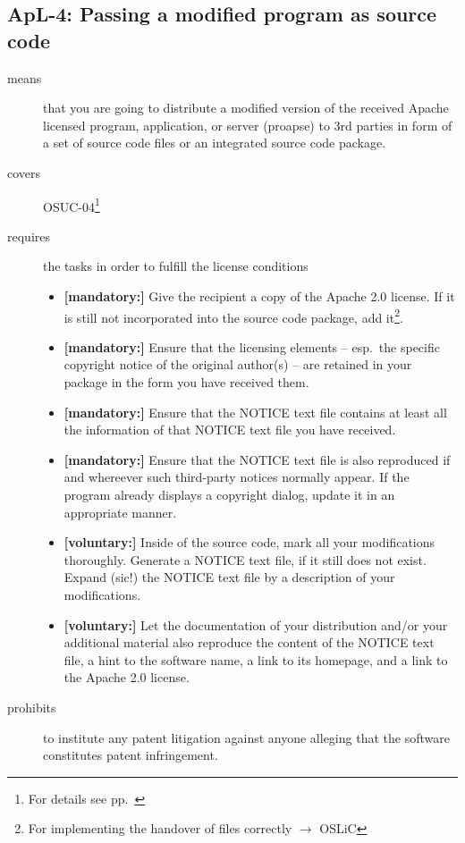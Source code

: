 \subsection{ApL-4: Passing a modified program as source code}
\label{OSUC-04-Apache20} 

\begin{description}
\item[means] that you are going to distribute a modified version of the received
Apache licensed program, application, or server (proapse) to 3rd parties in form
of a set of source code files or an integrated source code package.
\item[covers] OSUC-04\footnote{For details see pp.\ \pageref{OSUC-04-DEF}}
\item[requires] the tasks in order to fulfill the license conditions
\begin{itemize}
  
  \item \textbf{[mandatory:]} Give the recipient a copy of the Apache 2.0
  license. If it is still not incorporated into the source code package, add
  it\footnote{For implementing the handover of files correctly $\rightarrow$
  OSLiC \pageref{DistributingFilesHint}}.

  \item \textbf{[mandatory:]} Ensure that the licensing elements -- esp.\ the
  specific copyright notice of the original author(s) -- are retained in your
  package in the form you have received them.
  
  \item \textbf{[mandatory:]} Ensure that the NOTICE text file contains at least
  all the information of that NOTICE text file you have received.

  \item \textbf{[mandatory:]} Ensure that the NOTICE text file is also
  reproduced if and whereever such third-party notices normally appear. If the
  program already displays a copyright dialog, update it in an appropriate
  manner.
  
  \item \textbf{[voluntary:]} Inside of the source code, mark all your
  modifications thoroughly. Generate a NOTICE text file, if it still does not
  exist. Expand (sic!) the NOTICE text file by a description of your
  modifications.
   
  \item \textbf{[voluntary:]} Let the documentation of your distribution
  and/or your additional material also reproduce the content of the NOTICE text
  file, a hint to the software name, a link to its homepage, and a link to the
  Apache 2.0 license.
  
 \end{itemize}
 
\item[prohibits] to institute any patent litigation against anyone alleging that
the software constitutes patent infringement.

\end{description}

